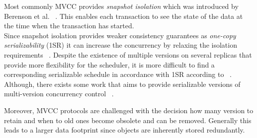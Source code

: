 Most commonly MVCC provides \emph{snapshot isolation} which was introduced by Berenson et al. ~\cite{berenson:1995}.
This enables each transaction to see the state of the data at the time when the transaction has started.\\
Since snapshot isolation provides weaker consistency guarantees as \emph{one-copy serializability} (1SR) it can increase the concurrency by relaxing 
the isolation requirements ~.
Despite the existence of multiple versions on several replicas that provide more flexibility for the scheduler, it 
is more difficult to find a corresponding serializable schedule in accordance with 1SR according to ~\cite{daudjee:2006}.\\
Although, there exists some work that aims to provide serializable versions of multi-version concurrency control ~\cite{fekete:2005, faleiro:2015}.

Moreover, MVCC protocols are challenged with the decision how many version to retain and when to old ones become obsolete and can be removed. 
Generally this leads to a larger data footprint since objects are inherently stored redundantly. 
